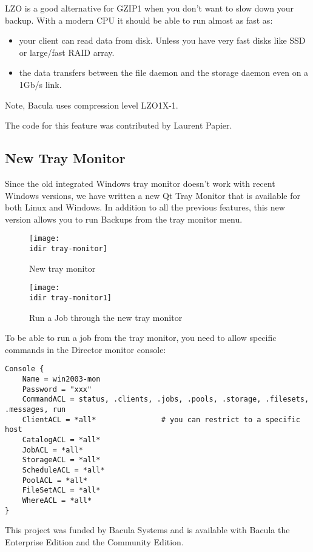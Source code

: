 LZO is a good alternative for GZIP1 when you don't want to slow down your
backup. With a modern CPU it should be able to run almost as fast as:

\begin{itemize}
\item your client can read data from disk. Unless you have very fast disks like
  SSD or large/fast RAID array.
\item the data transfers between the file daemon and the storage daemon even on
  a 1Gb/s link.
\end{itemize}

Note, Bacula uses compression level LZO1X-1.

\medskip
The code for this feature was contributed by Laurent Papier.

\subsection{New Tray Monitor}

Since the old integrated Windows tray monitor doesn't work with
recent Windows versions, we have written a new Qt Tray Monitor that is available
for both Linux and Windows.  In addition to all the previous features,
this new version allows you to run Backups from 
the tray monitor menu.

\begin{figure}[htbp]
  \centering
  \texttt{[image: \\idir tray-monitor]}
  \label{fig:traymonitor}
  \caption{New tray monitor}
\end{figure}

\begin{figure}[htbp]
  \centering
  \texttt{[image: \\idir tray-monitor1]}
  \label{fig:traymonitor1}
  \caption{Run a Job through the new tray monitor}
\end{figure}


To be able to run a job from the tray monitor, you need to
allow specific commands in the Director monitor console:
\begin{verbatim}
Console {
    Name = win2003-mon
    Password = "xxx"
    CommandACL = status, .clients, .jobs, .pools, .storage, .filesets, .messages, run
    ClientACL = *all*               # you can restrict to a specific host
    CatalogACL = *all*
    JobACL = *all*
    StorageACL = *all*
    ScheduleACL = *all*
    PoolACL = *all*
    FileSetACL = *all*
    WhereACL = *all*
}
\end{verbatim}

\medskip
This project was funded by Bacula Systems and is available with Bacula
the Enterprise Edition and the Community Edition.

